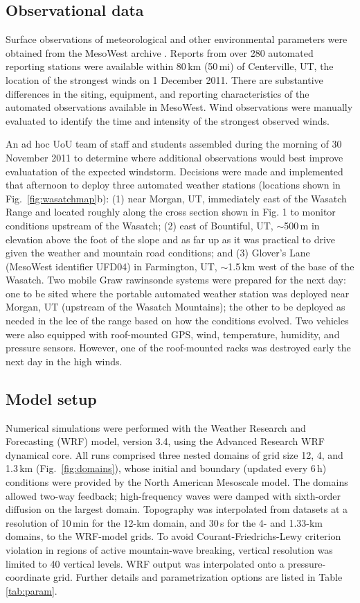 \documentclass[pdftex,12pt]{article}
\def\around{$\sim$}
\begin{document}
\subsection{Observational data}

Surface observations of meteorological and other environmental parameters were obtained from the MesoWest archive \citep{Horel2002}. Reports from over 280 automated reporting stations were available within 80\,km (50\,mi) of Centerville, UT, the location of the strongest winds on 1 December 2011. There are substantive differences in the siting, equipment, and reporting characteristics of the automated observations available in MesoWest. Wind observations were manually evaluated to identify the time and intensity of the strongest observed winds.

An ad hoc UoU team of staff and students assembled during the morning of 30 November 2011 to determine where additional observations would best improve evaluatation of the expected windstorm. Decisions were made and implemented that afternoon to deploy three automated weather stations (locations shown in Fig.~\ref{fig:wasatchmap}b): (1) near Morgan, UT, immediately east of the Wasatch Range and located roughly along the cross section shown in Fig. 1 to monitor conditions upstream of the Wasatch; (2) east of Bountiful, UT, \around 500\,m in elevation above the foot of the slope and as far up as it was practical to drive given the weather and mountain road conditions; and (3) Glover's Lane (MesoWest identifier UFD04) in Farmington, UT, \around 1.5\,km west of the base of the Wasatch. Two mobile Graw rawinsonde systems were prepared for the next day: one to be sited where the portable automated weather station was deployed near Morgan, UT (upstream of the Wasatch Mountains); the other to be deployed as needed in the lee of the range based on how the conditions evolved. Two vehicles were also equipped with roof-mounted GPS, wind, temperature, humidity, and pressure sensors. However, one of the roof-mounted racks was destroyed early the next day in the high winds.

\subsection{Model setup}
Numerical simulations were performed with the Weather Research and Forecasting (WRF) model, version 3.4, using the Advanced Research WRF dynamical core. All runs comprised three nested domains of grid size 12, 4, and 1.3\,km (Fig.~\ref{fig:domains}), whose initial and boundary  (updated every 6\,h) conditions were provided by the North American Mesoscale model. The domains allowed two-way feedback; high-frequency waves were damped with sixth-order diffusion on the largest domain. Topography was interpolated from datasets at a resolution of 10\,min for the 12-km domain, and 30\,s for the 4- and 1.33-km domains, to the WRF-model grids. To avoid Courant-Friedrichs-Lewy criterion violation in regions of active mountain-wave breaking, vertical resolution was limited to 40 vertical levels. WRF output was interpolated onto a pressure-coordinate grid. Further details and parametrization options are listed in Table \ref{tab:param}.
\end{document}
